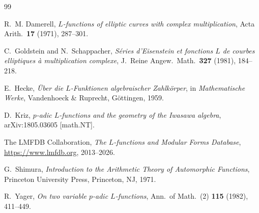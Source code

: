 \documentclass[12pt]{amsart}
\theoremstyle{definition}
\begin{document}
\begin{thebibliography}{99}

R.~M. Damerell,
\emph{$L$-functions of elliptic curves with complex multiplication},
Acta Arith.\ \textbf{17} (1971), 287--301.

C.~Goldstein and N.~Schappacher,
\emph{S\'eries d'Eisenstein et fonctions $L$ de courbes elliptiques \`a multiplication complexe},
J.~Reine Angew.\ Math.\ \textbf{327} (1981), 184--218.

E.~Hecke,
\emph{\"Uber die $L$-Funktionen algebraischer Zahlk\"orper},
in \emph{Mathematische Werke}, Vandenhoeck \& Ruprecht, G\"ottingen, 1959.

D.~Kriz,
\emph{$p$-adic $L$-functions and the geometry of the Iwasawa algebra},
arXiv:1805.03605 [math.NT].

The LMFDB Collaboration,
\emph{The $L$-functions and Modular Forms Database},
\url{https://www.lmfdb.org}, 2013--2026.

G.~Shimura,
\emph{Introduction to the Arithmetic Theory of Automorphic Functions},
Princeton University Press, Princeton, NJ, 1971.

R.~Yager,
\emph{On two variable $p$-adic $L$-functions},
Ann.\ of Math.\ (2) \textbf{115} (1982), 411--449.

\end{thebibliography}
\end{document}
